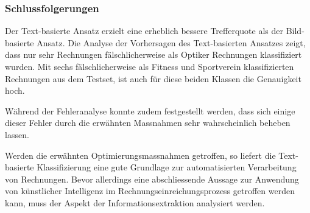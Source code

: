 \subsubsection{Schlussfolgerungen}

Der Text-basierte Ansatz erzielt eine erheblich bessere Trefferquote als der Bild-basierte Ansatz. Die Analyse der Vorhersagen des Text-basierten Ansatzes zeigt, dass nur sehr Rechnungen fälschlicherweise als Optiker Rechnungen klassifiziert wurden. Mit sechs fälschlicherweise als Fitness und Sportverein klassifizierten Rechnungen aus dem Testset, ist auch für diese beiden Klassen die Genauigkeit hoch. 


Während der Fehleranalyse konnte zudem festgestellt werden, dass sich einige dieser Fehler durch die erwähnten Massnahmen sehr wahrscheinlich beheben lassen.

Werden die erwähnten Optimierungsmassnahmen getroffen, so liefert die Text-basierte Klassifizierung eine gute Grundlage zur automatisierten Verarbeitung von Rechnungen. Bevor allerdings eine abschliessende Aussage zur Anwendung von künstlicher Intelligenz im Rechnungseinreichungsprozess getroffen werden kann, muss der Aspekt der Informationsextraktion analysiert werden.
